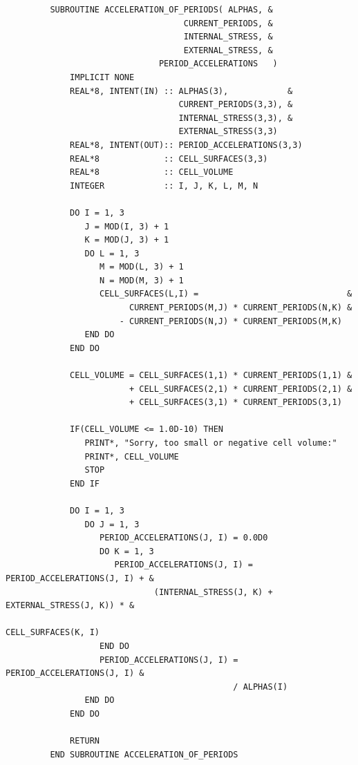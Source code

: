 \documentclass[aps]{revtex4}
\begin{document}
\begin{verbatim}
         SUBROUTINE ACCELERATION_OF_PERIODS( ALPHAS, &
                                    CURRENT_PERIODS, &
                                    INTERNAL_STRESS, &
                                    EXTERNAL_STRESS, &
                               PERIOD_ACCELERATIONS   )
             IMPLICIT NONE
             REAL*8, INTENT(IN) :: ALPHAS(3),            &
                                   CURRENT_PERIODS(3,3), &
                                   INTERNAL_STRESS(3,3), &
                                   EXTERNAL_STRESS(3,3)
             REAL*8, INTENT(OUT):: PERIOD_ACCELERATIONS(3,3)
             REAL*8             :: CELL_SURFACES(3,3)
             REAL*8             :: CELL_VOLUME
             INTEGER            :: I, J, K, L, M, N

             DO I = 1, 3
                J = MOD(I, 3) + 1
                K = MOD(J, 3) + 1
                DO L = 1, 3
                   M = MOD(L, 3) + 1
                   N = MOD(M, 3) + 1
                   CELL_SURFACES(L,I) =                              &
                         CURRENT_PERIODS(M,J) * CURRENT_PERIODS(N,K) &
                       - CURRENT_PERIODS(N,J) * CURRENT_PERIODS(M,K)
                END DO
             END DO

             CELL_VOLUME = CELL_SURFACES(1,1) * CURRENT_PERIODS(1,1) &
                         + CELL_SURFACES(2,1) * CURRENT_PERIODS(2,1) &
                         + CELL_SURFACES(3,1) * CURRENT_PERIODS(3,1)

             IF(CELL_VOLUME <= 1.0D-10) THEN
                PRINT*, "Sorry, too small or negative cell volume:"
                PRINT*, CELL_VOLUME
                STOP
             END IF

             DO I = 1, 3
                DO J = 1, 3
                   PERIOD_ACCELERATIONS(J, I) = 0.0D0
                   DO K = 1, 3
                      PERIOD_ACCELERATIONS(J, I) = PERIOD_ACCELERATIONS(J, I) + &
                              (INTERNAL_STRESS(J, K) + EXTERNAL_STRESS(J, K)) * &
                                                          CELL_SURFACES(K, I)
                   END DO
                   PERIOD_ACCELERATIONS(J, I) = PERIOD_ACCELERATIONS(J, I) &
                                              / ALPHAS(I)
                END DO
             END DO

             RETURN
         END SUBROUTINE ACCELERATION_OF_PERIODS
\end{verbatim}
\end{document}
